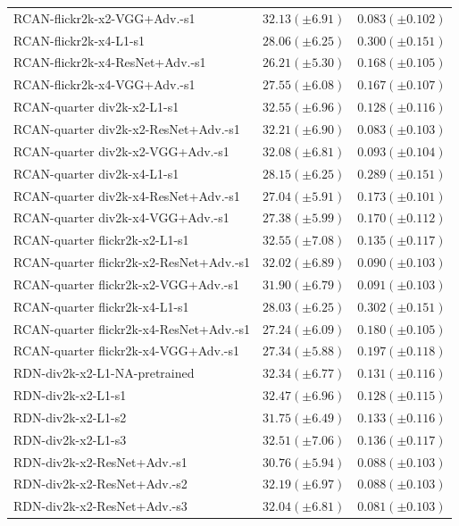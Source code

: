 \documentclass[10pt]{article} %
\begin{document}
\begin{longtable}{| p{} | p{} | p{} |}
RCAN-flickr2k-x2-VGG+Adv.-s1 & $32.13 (\pm 6.91)$ & $0.083 (\pm 0.102)$ \\
RCAN-flickr2k-x4-L1-s1 & $28.06 (\pm 6.25)$ & $0.300 (\pm 0.151)$ \\
RCAN-flickr2k-x4-ResNet+Adv.-s1 & $26.21 (\pm 5.30)$ & $0.168 (\pm 0.105)$ \\
RCAN-flickr2k-x4-VGG+Adv.-s1 & $27.55 (\pm 6.08)$ & $0.167 (\pm 0.107)$ \\
RCAN-quarter div2k-x2-L1-s1 & $32.55 (\pm 6.96)$ & $0.128 (\pm 0.116)$ \\
RCAN-quarter div2k-x2-ResNet+Adv.-s1 & $32.21 (\pm 6.90)$ & $0.083 (\pm 0.103)$ \\
RCAN-quarter div2k-x2-VGG+Adv.-s1 & $32.08 (\pm 6.81)$ & $0.093 (\pm 0.104)$ \\
RCAN-quarter div2k-x4-L1-s1 & $28.15 (\pm 6.25)$ & $0.289 (\pm 0.151)$ \\
RCAN-quarter div2k-x4-ResNet+Adv.-s1 & $27.04 (\pm 5.91)$ & $0.173 (\pm 0.101)$ \\
RCAN-quarter div2k-x4-VGG+Adv.-s1 & $27.38 (\pm 5.99)$ & $0.170 (\pm 0.112)$ \\
RCAN-quarter flickr2k-x2-L1-s1 & $32.55 (\pm 7.08)$ & $0.135 (\pm 0.117)$ \\
RCAN-quarter flickr2k-x2-ResNet+Adv.-s1 & $32.02 (\pm 6.89)$ & $0.090 (\pm 0.103)$ \\
RCAN-quarter flickr2k-x2-VGG+Adv.-s1 & $31.90 (\pm 6.79)$ & $0.091 (\pm 0.103)$ \\
RCAN-quarter flickr2k-x4-L1-s1 & $28.03 (\pm 6.25)$ & $0.302 (\pm 0.151)$ \\
RCAN-quarter flickr2k-x4-ResNet+Adv.-s1 & $27.24 (\pm 6.09)$ & $0.180 (\pm 0.105)$ \\
RCAN-quarter flickr2k-x4-VGG+Adv.-s1 & $27.34 (\pm 5.88)$ & $0.197 (\pm 0.118)$ \\
RDN-div2k-x2-L1-NA-pretrained & $32.34 (\pm 6.77)$ & $0.131 (\pm 0.116)$ \\
RDN-div2k-x2-L1-s1 & $32.47 (\pm 6.96)$ & $0.128 (\pm 0.115)$ \\
RDN-div2k-x2-L1-s2 & $31.75 (\pm 6.49)$ & $0.133 (\pm 0.116)$ \\
RDN-div2k-x2-L1-s3 & $32.51 (\pm 7.06)$ & $0.136 (\pm 0.117)$ \\
RDN-div2k-x2-ResNet+Adv.-s1 & $30.76 (\pm 5.94)$ & $0.088 (\pm 0.103)$ \\
RDN-div2k-x2-ResNet+Adv.-s2 & $32.19 (\pm 6.97)$ & $0.088 (\pm 0.103)$ \\
RDN-div2k-x2-ResNet+Adv.-s3 & $32.04 (\pm 6.81)$ & $0.081 (\pm 0.103)$ \\

\end{longtable}
\end{document}

